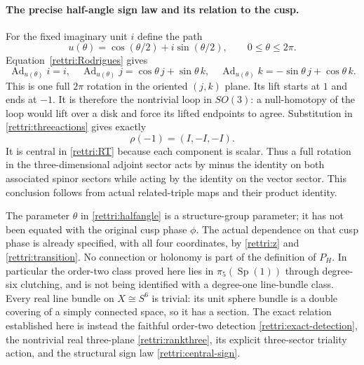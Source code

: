 \documentclass[11pt]{article}
\theoremstyle{definition}
\begin{document}
\paragraph{The precise half-angle sign law and its relation to the cusp.}
For the fixed imaginary unit $i$ define the path
\begin{equation}
 u(\theta)=\cos(\theta/2)+i\sin(\theta/2),
                   \qquad 0\le\theta\le2\pi.
 \label{rettri:halfangle}
\end{equation}
Equation~\eqref{rettri:Rodrigues} gives
\[
 \operatorname{Ad}_{u(\theta)}i=i,\quad
 \operatorname{Ad}_{u(\theta)}j=\cos\theta\,j+\sin\theta\,k,\quad
 \operatorname{Ad}_{u(\theta)}k=-\sin\theta\,j+\cos\theta\,k.
\]
This is one full $2\pi$ rotation in the oriented $(j,k)$ plane.
Its lift starts at $1$ and ends at $-1$. It is therefore the
nontrivial loop in $SO(3)$: a null-homotopy of the loop would
lift over a disk and force its lifted endpoints to agree.
Substitution in \eqref{rettri:threeactions} gives exactly
\begin{equation}
 \rho(-1)=(I,-I,-I).
 \label{rettri:central-sign}
\end{equation}
It is central in \eqref{rettri:RT} because each component
is scalar. Thus a full rotation in the three-dimensional
adjoint sector acts by minus the identity on both associated
spinor sectors while acting by the identity on the vector
sector. This conclusion follows from actual related-triple
maps and their product identity.

The parameter $\theta$ in \eqref{rettri:halfangle} is a
structure-group parameter; it has not been equated with the
original cusp phase $\phi$. The actual dependence on that cusp
phase is already specified, with all four coordinates, by
\eqref{rettri:z} and \eqref{rettri:transition}.
No connection or holonomy is part of the definition of $P_H$.
In particular the order-two class proved here lies in
$\pi_5(\operatorname{Sp}(1))$ through degree-six clutching,
and is not being identified with a degree-one line-bundle
class. Every real line bundle on $X\cong S^6$ is trivial:
its unit sphere bundle is a double covering of a simply
connected space, so it has a section. The exact relation
established here is instead the faithful order-two detection
\eqref{rettri:exact-detection}, the nontrivial real
three-plane \eqref{rettri:rankthree}, its explicit
three-sector triality action, and the structural sign law
\eqref{rettri:central-sign}.

\end{document}
